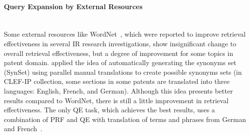 \paragraph{Query Expansion by External Resources}
\ \\
Some external resources like WordNet~\citep{miller1990introduction}, which were reported to improve retrieval effectiveness in several IR research investigations, show insignificant change to overall retrieval effectiveness, but a degree of improvement for some topics in patent domain. \cite{magdy2011study} applied the idea of automatically generating the synonyms set (SynSet) using parallel manual translations to create possible synonyms sets (in CLEF-IP collection, some sections in some patents are translated into three languages: English, French, and German). Although this idea presents better results compared to WordNet, there is still a little improvement in retrieval effectiveness. The only QE task, which achieves the best results, uses a combination of PRF and QE with translation of terms and phrases from German and French~\citep{jochim2011expanding}.
